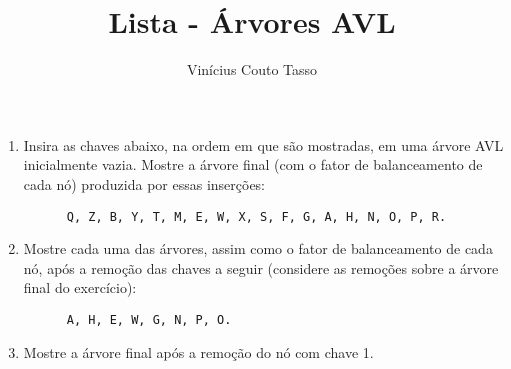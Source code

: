 \documentclass{article}
\title{Lista - Árvores AVL}
\author{Vinícius Couto Tasso}
\date{}
\begin{document}
\maketitle
{}
         
\begin{enumerate}

\item Insira as chaves abaixo, na ordem em que são mostradas, em uma árvore AVL inicialmente vazia. Mostre a árvore final (com o fator de balanceamento de cada nó) produzida por essas inserções:

\begin{center}
    \begin{verbatim}
      Q, Z, B, Y, T, M, E, W, X, S, F, G, A, H, N, O, P, R.
    \end{verbatim}
\end{center}



\item Mostre cada uma das árvores, assim como o fator de balanceamento de cada nó, após a remoção das chaves a seguir (considere as remoções sobre a árvore final do exercício):

\begin{center}
    \begin{verbatim}
      A, H, E, W, G, N, P, O.
    \end{verbatim}
\end{center}



\item Mostre a árvore final após a remoção do nó com chave 1.



\end{enumerate}
\end{document}
